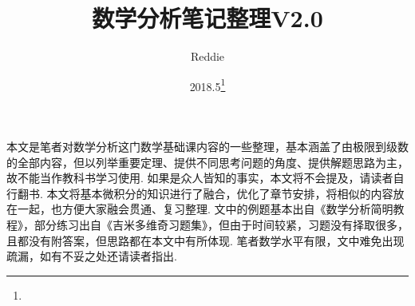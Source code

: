 \documentclass[11pt,UTF8]{ctexart}
\title{数学分析笔记整理V2.0}
\author{Reddie}
\date{2018.5\footnote{\text{Build 20180321}}}%
\renewcommand{\thefootnote}{\fnsymbol{footnote}}
\begin{document}
\maketitle
\renewcommand{\thefootnote}{\arabic{footnote}}
\setcounter{footnote}{0}

\setcounter{tocdepth}{2}%
\tableofcontents
\bigskip\bigskip\bigskip

\par 本文是笔者对数学分析这门数学基础课内容的一些整理，基本涵盖了由极限到级数的全部内容，但以列举重要定理、提供不同思考问题的角度、提供解题思路为主，故不能当作教科书学习使用. 如果是众人皆知的事实，本文将不会提及，请读者自行翻书. 本文将基本微积分的知识进行了融合，优化了章节安排，将相似的内容放在一起，也方便大家融会贯通、复习整理. 文中的例题基本出自《数学分析简明教程》，部分练习出自《吉米多维奇习题集》，但由于时间较紧，习题没有择取很多，且都没有附答案，但思路都在本文中有所体现. 笔者数学水平有限，文中难免出现疏漏，如有不妥之处还请读者指出. 







\end{document}
